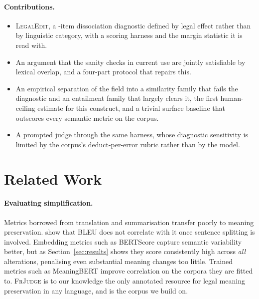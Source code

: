 \documentclass[11pt]{article}
\begin{document}
\paragraph{Contributions.}
\begin{itemize}\itemsep2pt\parskip0pt
\item \textsc{LegalEdit}, a \numedits-item dissociation diagnostic defined by
      legal effect rather than by linguistic category, with a scoring harness
      and the margin statistic it is read with.
\item An argument that the sanity checks in current use are jointly satisfiable
      by lexical overlap, and a four-part protocol that repairs this.
\item An empirical separation of the field into a similarity family that fails
      the diagnostic and an entailment family that largely clears it, the first
      human-ceiling estimate for this construct, and a trivial surface baseline
      that outscores every semantic metric on the corpus.
\item A prompted judge through the same harness, whose diagnostic sensitivity
      is limited by the corpus's deduct-per-error rubric rather than by the
      model.
\end{itemize}

\section{Related Work}
\label{sec:related}

\paragraph{Evaluating simplification.}
Metrics borrowed from translation and summarisation transfer poorly to meaning
preservation. \citet{sulem2018bleu} show that BLEU does not correlate with it
once sentence splitting is involved. Embedding metrics such as BERTScore
\citep{zhang2019bertscore} capture semantic variability better, but as
Section~\ref{sec:results} shows they score consistently high across \emph{all}
alterations, penalising even substantial meaning changes too little. Trained
metrics such as MeaningBERT \citep{beauchemin2023meaningbert} improve
correlation on the corpora they are fitted to. \textsc{FrJudge}
\citep{beauchemin2025judgebert} is to our knowledge the only annotated resource
for legal meaning preservation in any language, and is the corpus we build on.
\end{document}
